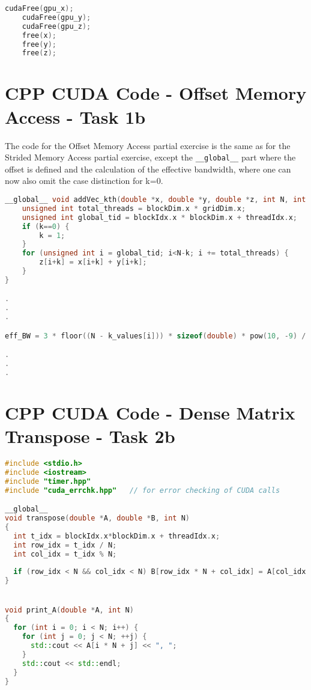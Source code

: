 \begin{appendix}
\begin{lstlisting}[language=C++, title=C++ Listing for EX1 a)]
	cudaFree(gpu_x);
	cudaFree(gpu_y);
	cudaFree(gpu_z);
	free(x);
	free(y);
	free(z);
\end{lstlisting}
\pagebreak

\section{CPP CUDA Code - Offset Memory Access - Task 1b}
The code for the Offset Memory Access partial exercise is the same as for the
Strided Memory Access partial exercise, except the \texttt{\_\_global\_\_} part where
the offset is defined and the calculation of the effective bandwidth, where one can now
 also omit the case distinction for k=0.

\null

\label{app_1b}
\begin{lstlisting}[language=C++, title=C++ Listing for EX1 b)]
__global__ void addVec_kth(double *x, double *y, double *z, int N, int k) {
	unsigned int total_threads = blockDim.x * gridDim.x;
	unsigned int global_tid = blockIdx.x * blockDim.x + threadIdx.x;
	if (k==0) {
		k = 1;
	}
	for (unsigned int i = global_tid; i<N-k; i += total_threads) {
		z[i+k] = x[i+k] + y[i+k];
	}
}

.
.
.

eff_BW = 3 * floor((N - k_values[i])) * sizeof(double) * pow(10, -9) / findMedian(exec_timings, 10);

.
.
.

\end{lstlisting}

\pagebreak

\section{CPP CUDA Code - Dense Matrix Transpose - Task 2b}
\label{app_2b}

\begin{lstlisting}[language=C++, title=C++ Listing for EX2 b and c]
#include <stdio.h>
#include <iostream>
#include "timer.hpp"
#include "cuda_errchk.hpp"   // for error checking of CUDA calls

__global__
void transpose(double *A, double *B, int N)
{
  int t_idx = blockIdx.x*blockDim.x + threadIdx.x;
  int row_idx = t_idx / N;
  int col_idx = t_idx % N;
  
  if (row_idx < N && col_idx < N) B[row_idx * N + col_idx] = A[col_idx * N + row_idx];
}


void print_A(double *A, int N)
{
  for (int i = 0; i < N; i++) {
    for (int j = 0; j < N; ++j) {
      std::cout << A[i * N + j] << ", ";
    }
    std::cout << std::endl;
  }
}


\end{lstlisting}
\end{appendix}
